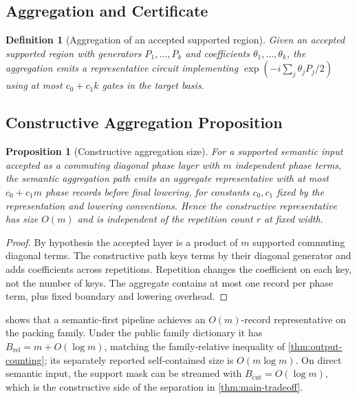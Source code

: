 \documentclass[aps,prx,reprint,floatfix,superscriptaddress]{revtex4-2}
\newtheorem{definition}{Definition}
\newtheorem{proposition}{Proposition}
\begin{document}
\subsection{Aggregation and Certificate}

\begin{definition}[Aggregation of an accepted supported region]
\label{def:aggregation}
Given an accepted supported region with generators $P_1,\ldots,P_k$ and coefficients
$\theta_1,\ldots,\theta_k$, the aggregation emits a representative
circuit implementing $\exp(-i\sum_j \theta_j P_j / 2)$ using at most
$c_0 + c_1 k$ gates in the target basis.
\end{definition}



\subsection{Constructive Aggregation Proposition}

\begin{proposition}[Constructive aggregation size]
\label{prop:constructive-aggregation}
For a supported semantic input accepted as a commuting diagonal phase layer
with $m$ independent phase terms, the semantic aggregation path emits an aggregate representative with at
most $c_0 + c_1 m$ phase records before final lowering, for constants
$c_0, c_1$ fixed by the representation and lowering conventions. Hence
the constructive representative has size $O(m)$ and is independent of the
repetition count $r$ at fixed width.
\end{proposition}

\begin{proof}
By hypothesis the accepted layer is a product of $m$ supported commuting
diagonal terms. The constructive
path keys terms by their diagonal generator and adds coefficients across
repetitions. Repetition changes the coefficient on each key, not the
number of keys. The aggregate contains at most one record per phase term,
plus fixed boundary and lowering overhead.
\end{proof}

 shows that a semantic-first pipeline
achieves an $O(m)$-record representative on the packing family.  Under the
public family dictionary it has
$B_{\mathrm{rel}}=m+O(\log m)$, matching the
family-relative inequality of \cref{thm:output-counting}; its separately
reported self-contained size is $O(m\log m)$.  On direct semantic input,
the support mask can be streamed with $B_{\mathrm{cut}}=O(\log m)$, which
is the constructive side of the separation in
\cref{thm:main-tradeoff}.
\end{document}
